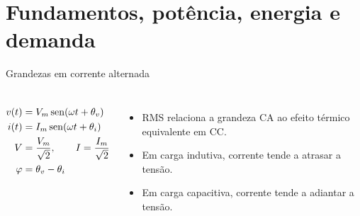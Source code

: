 \section{Fundamentos, potência, energia e demanda}

\begin{frame}{Grandezas em corrente alternada}
\small
\begin{columns}[T,onlytextwidth]
\begin{align*}
v(t)&=V_m\operatorname{sen}(\omega t+\theta_v)\\
i(t)&=I_m\operatorname{sen}(\omega t+\theta_i)\\
V&=\frac{V_m}{\sqrt{2}},\qquad I=\frac{I_m}{\sqrt{2}}\\
\varphi&=\theta_v-\theta_i
\end{align*}
\begin{itemize}
\item RMS relaciona a grandeza CA ao efeito térmico equivalente em CC.
\item Em carga indutiva, corrente tende a atrasar a tensão.
\item Em carga capacitiva, corrente tende a adiantar a tensão.
\end{itemize}
\end{columns}
\end{frame}

